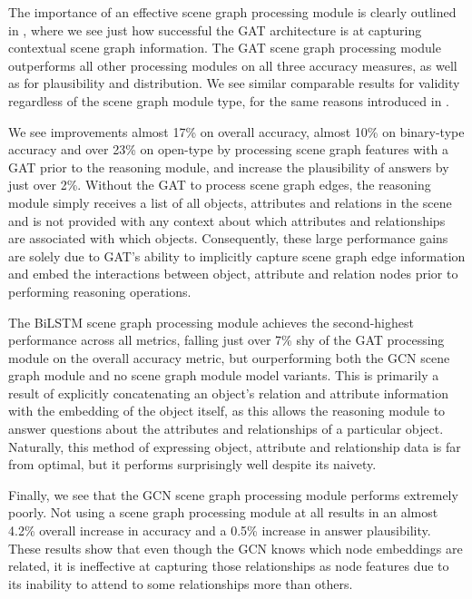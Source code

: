 The importance of an effective scene graph processing module is clearly outlined in \tableautorefname{ \ref{table:scene_graph_ablation_main}}, where we see just how successful the GAT architecture is at capturing contextual scene graph information. The GAT scene graph processing module outperforms all other processing modules on all three accuracy measures, as well as for plausibility and distribution. We see similar comparable results for validity regardless of the scene graph module type, for the same reasons introduced in \sectionautorefname{ \ref{section:performance_evaluation}}.

We see improvements almost 17\% on overall accuracy, almost 10\% on binary-type accuracy and over 23\% on open-type by processing scene graph features with a GAT prior to the reasoning module, and increase the plausibility of answers by just over 2\%. Without the GAT to process scene graph edges, the reasoning module simply receives a list of all objects, attributes and relations in the scene and is not provided with any context about which attributes and relationships are associated with which objects. Consequently, these large performance gains are solely due to GAT's ability to implicitly capture scene graph edge information and embed the interactions between object, attribute and relation nodes prior to performing reasoning operations.

The BiLSTM scene graph processing module achieves the second-highest performance across all metrics, falling just over 7\% shy of the GAT processing module on the overall accuracy metric, but ourperforming both the GCN scene graph module and no scene graph module model variants. This is primarily a result of explicitly concatenating an object's relation and attribute information with the embedding of the object itself, as this allows the reasoning module to answer questions about the attributes and relationships of a particular object. Naturally, this method of expressing object, attribute and relationship data is far from optimal, but it performs surprisingly well despite its naivety.

Finally, we see that the GCN scene graph processing module performs extremely poorly. Not using a scene graph processing module at all results in an almost 4.2\% overall increase in accuracy and a 0.5\% increase in answer plausibility. These results show that even though the GCN knows which node embeddings are related, it is ineffective at capturing those relationships as node features due to its inability to attend to some relationships more than others.

